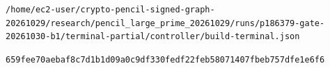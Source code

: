 \documentclass[10pt]{article}
\begin{document}
\texttt{\small /\allowbreak{}h\allowbreak{}o\allowbreak{}m\allowbreak{}e\allowbreak{}/\allowbreak{}e\allowbreak{}c\allowbreak{}2\allowbreak{}-\allowbreak{}u\allowbreak{}s\allowbreak{}e\allowbreak{}r\allowbreak{}/\allowbreak{}c\allowbreak{}r\allowbreak{}y\allowbreak{}p\allowbreak{}t\allowbreak{}o\allowbreak{}-\allowbreak{}p\allowbreak{}e\allowbreak{}n\allowbreak{}c\allowbreak{}i\allowbreak{}l\allowbreak{}-\allowbreak{}s\allowbreak{}i\allowbreak{}g\allowbreak{}n\allowbreak{}e\allowbreak{}d\allowbreak{}-\allowbreak{}g\allowbreak{}r\allowbreak{}a\allowbreak{}p\allowbreak{}h\allowbreak{}-\allowbreak{}2\allowbreak{}0\allowbreak{}2\allowbreak{}6\allowbreak{}1\allowbreak{}0\allowbreak{}2\allowbreak{}9\allowbreak{}/\allowbreak{}r\allowbreak{}e\allowbreak{}s\allowbreak{}e\allowbreak{}a\allowbreak{}r\allowbreak{}c\allowbreak{}h\allowbreak{}/\allowbreak{}p\allowbreak{}e\allowbreak{}n\allowbreak{}c\allowbreak{}i\allowbreak{}l\allowbreak{}\_\allowbreak{}l\allowbreak{}a\allowbreak{}r\allowbreak{}g\allowbreak{}e\allowbreak{}\_\allowbreak{}p\allowbreak{}r\allowbreak{}i\allowbreak{}m\allowbreak{}e\allowbreak{}\_\allowbreak{}2\allowbreak{}0\allowbreak{}2\allowbreak{}6\allowbreak{}1\allowbreak{}0\allowbreak{}2\allowbreak{}9\allowbreak{}/\allowbreak{}r\allowbreak{}u\allowbreak{}n\allowbreak{}s\allowbreak{}/\allowbreak{}p\allowbreak{}1\allowbreak{}8\allowbreak{}6\allowbreak{}3\allowbreak{}7\allowbreak{}9\allowbreak{}-\allowbreak{}g\allowbreak{}a\allowbreak{}t\allowbreak{}e\allowbreak{}-\allowbreak{}2\allowbreak{}0\allowbreak{}2\allowbreak{}6\allowbreak{}1\allowbreak{}0\allowbreak{}3\allowbreak{}0\allowbreak{}-\allowbreak{}b\allowbreak{}1\allowbreak{}/\allowbreak{}t\allowbreak{}e\allowbreak{}r\allowbreak{}m\allowbreak{}i\allowbreak{}n\allowbreak{}a\allowbreak{}l\allowbreak{}-\allowbreak{}p\allowbreak{}a\allowbreak{}r\allowbreak{}t\allowbreak{}i\allowbreak{}a\allowbreak{}l\allowbreak{}/\allowbreak{}c\allowbreak{}o\allowbreak{}n\allowbreak{}t\allowbreak{}r\allowbreak{}o\allowbreak{}l\allowbreak{}l\allowbreak{}e\allowbreak{}r\allowbreak{}/\allowbreak{}b\allowbreak{}u\allowbreak{}i\allowbreak{}l\allowbreak{}d\allowbreak{}-\allowbreak{}t\allowbreak{}e\allowbreak{}r\allowbreak{}m\allowbreak{}i\allowbreak{}n\allowbreak{}a\allowbreak{}l\allowbreak{}.\allowbreak{}j\allowbreak{}s\allowbreak{}o\allowbreak{}n\allowbreak{}}\par\texttt{\small 6\allowbreak{}5\allowbreak{}9\allowbreak{}f\allowbreak{}e\allowbreak{}e\allowbreak{}7\allowbreak{}0\allowbreak{}a\allowbreak{}e\allowbreak{}b\allowbreak{}a\allowbreak{}f\allowbreak{}8\allowbreak{}c\allowbreak{}7\allowbreak{}d\allowbreak{}1\allowbreak{}b\allowbreak{}1\allowbreak{}d\allowbreak{}0\allowbreak{}9\allowbreak{}a\allowbreak{}0\allowbreak{}c\allowbreak{}9\allowbreak{}d\allowbreak{}f\allowbreak{}3\allowbreak{}3\allowbreak{}0\allowbreak{}f\allowbreak{}e\allowbreak{}d\allowbreak{}f\allowbreak{}2\allowbreak{}2\allowbreak{}f\allowbreak{}e\allowbreak{}b\allowbreak{}5\allowbreak{}8\allowbreak{}0\allowbreak{}7\allowbreak{}1\allowbreak{}4\allowbreak{}0\allowbreak{}7\allowbreak{}f\allowbreak{}b\allowbreak{}e\allowbreak{}b\allowbreak{}7\allowbreak{}5\allowbreak{}7\allowbreak{}d\allowbreak{}f\allowbreak{}e\allowbreak{}1\allowbreak{}e\allowbreak{}6\allowbreak{}f\allowbreak{}6\allowbreak{}}\par
\end{document}
